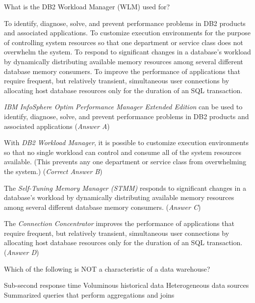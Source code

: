 \documentclass[answers, 11pt]{exam}
\begin{document}
\begin{questions}
\begin{solution}
\end{solution}


\question[1]
What is the DB2 Workload Manager (WLM) used for?
\begin{choices}
\choice To identify, diagnose, solve, and prevent performance problems in DB2 products and associated applications.
\CorrectChoice To customize execution environments for the purpose of controlling system resources so that one
		department or service class does not overwhelm the system.
\choice To respond to significant changes in a database's workload by dynamically distributing available memory resources
		among several different database memory consumers.
\choice To improve the performance of applications that require frequent, but relatively transient, simultaneous user
		connections by allocating host database resources only for the duration of an SQL transaction.
\end{choices}

\begin{solution}
\textit{IBM InfoSphere Optim Performance Manager Extended Edition} can be used to 
identify, diagnose, solve, and prevent performance problems in DB2 products and
associated applications (\textit{Answer A})
\par

With \textit{DB2 Workload Manager}, it is possible to customize execution
environments so that no single workload can control and consume all of the system
resources available. (This prevents any one department or service class from
overwhelming the system.) (\textit{Correct Answer B})
\par

The \textit{Self-Tuning Memory Manager (STMM)} responds to significant changes in
a database's workload by dynamically distributing available memory resources among
several different database memory consumers. (\textit{Answer C})
\par

The \textit{Connection Concentrator} improves the performance of applications that
require frequent, but relatively transient, simultaneous user connections by
allocating host database resources only for the duration of an SQL transaction. 
(\textit{Answer D})

\end{solution}


\question[1]
Which of the following is NOT a characteristic of a data warehouse?
\begin{choices}
\CorrectChoice Sub-second response time
\choice Voluminous historical data
\choice Heterogeneous data sources
\choice Summarized queries that perform aggregations and joins
\end{choices}


\end{questions}
\end{document}
